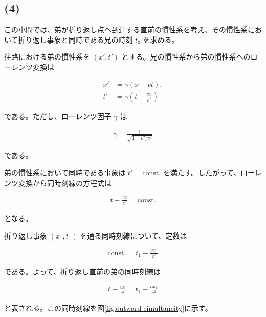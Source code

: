 \documentclass[platex,dvipdfmx,a4paper]{jsarticle}
\begin{document}
\subsection*{(4)}

この小問では、弟が折り返し点へ到達する直前の慣性系を考え、その慣性系において折り返し事象と同時である兄の時刻 \(t_3\) を求める。

往路における弟の慣性系を \((x',t')\) とする。兄の慣性系から弟の慣性系へのローレンツ変換は

\begin{align*}
  x'&=\gamma(x-vt), \\
  t'&=\gamma\left(t-\frac{vx}{c^2}\right)
\end{align*}

である。ただし、ローレンツ因子 \(\gamma\) は

\begin{align*}
  \gamma=\frac{1}{\sqrt{1-v^2/c^2}}
\end{align*}

である。

弟の慣性系において同時である事象は \(t'=\mathrm{const.}\) を満たす。したがって、ローレンツ変換から同時刻線の方程式は

\begin{align*}
  t-\frac{vx}{c^2}=\mathrm{const.}
\end{align*}

となる。

折り返し事象 \((x_1,t_1)\) を通る同時刻線について、定数は

\begin{align*}
  \mathrm{const.}=t_1-\frac{vx_1}{c^2}
\end{align*}

である。よって、折り返し直前の弟の同時刻線は

\begin{align*}
  t-\frac{vx}{c^2}=t_1-\frac{vx_1}{c^2}
\end{align*}

と表される。この同時刻線を図\ref{fig:outward-simultaneity}に示す。
\end{document}
